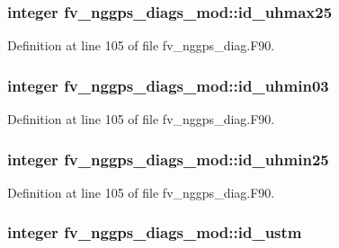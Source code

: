 \subsubsection[{id\-\_\-uhmax25}]{\setlength{\rightskip}{0pt plus 5cm}integer fv\-\_\-nggps\-\_\-diags\-\_\-mod\-::id\-\_\-uhmax25\hspace{0.3cm}{\ttfamily [private]}}\label{classfv__nggps__diags__mod_a8380e83c77a5d69766a8b48f53f632ba}


Definition at line 105 of file fv\-\_\-nggps\-\_\-diag.\-F90.

\subsubsection[{id\-\_\-uhmin03}]{\setlength{\rightskip}{0pt plus 5cm}integer fv\-\_\-nggps\-\_\-diags\-\_\-mod\-::id\-\_\-uhmin03\hspace{0.3cm}{\ttfamily [private]}}\label{classfv__nggps__diags__mod_ad44911da667d63fa3868d6a7de563a06}


Definition at line 105 of file fv\-\_\-nggps\-\_\-diag.\-F90.

\subsubsection[{id\-\_\-uhmin25}]{\setlength{\rightskip}{0pt plus 5cm}integer fv\-\_\-nggps\-\_\-diags\-\_\-mod\-::id\-\_\-uhmin25\hspace{0.3cm}{\ttfamily [private]}}\label{classfv__nggps__diags__mod_a846858aba1610f7019bf8ccfa5a180d5}


Definition at line 105 of file fv\-\_\-nggps\-\_\-diag.\-F90.

\subsubsection[{id\-\_\-ustm}]{\setlength{\rightskip}{0pt plus 5cm}integer fv\-\_\-nggps\-\_\-diags\-\_\-mod\-::id\-\_\-ustm\hspace{0.3cm}{\ttfamily [private]}}\label{classfv__nggps__diags__mod_a0a344ad39e04d91a5681074202f28f33}


